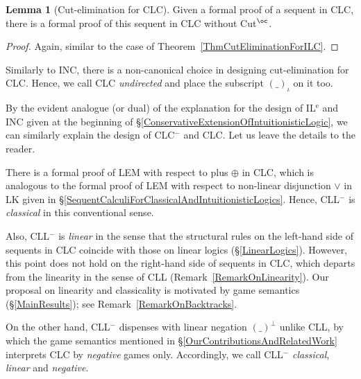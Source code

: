 \documentclass[a4paper]{article}
\theoremstyle{definition}
\theoremstyle{theorem}
\newtheorem{lemma}[definition]{Lemma}
\theoremstyle{remark}
\begin{document}
\begin{lemma}[Cut-elimination for \textsf{CLC}]
\label{PropCutEliminationForCLC}
Given a formal proof of a sequent in \textsf{CLC}, there is a formal proof of this sequent in \textsf{CLC} without Cut$^\oc$.
\end{lemma}
\begin{proof}
Again, similar to the case of Theorem~\ref{ThmCutEliminationForILC}.
\end{proof}

Similarly to \textsf{INC}, there is a non-canonical choice in designing cut-elimination for \textsf{CLC}.
Hence, we call \textsf{CLC} \emph{undirected} and place the subscript $(\_)_\iota$ on it too.
\fi

By the evident analogue (or dual) of the explanation for the design of IL$^{\text{e}}$ and \textsf{INC} given at the beginning of \S\ref{ConservativeExtensionOfIntuitionisticLogic}, we can similarly explain the design of CLC$^-$ and \textsf{CLC}.
Let us leave the details to the reader.

There is a formal proof of LEM with respect to plus $\oplus$ in \textsf{CLC}, which is analogous to the formal proof of LEM with respect to non-linear disjunction $\vee$ in \textsf{LK} given in \S\ref{SequentCalculiForClassicalAndIntuitionisticLogics}.
Hence, CLL$^-$ is \emph{classical} in this conventional sense.

Also, CLL$^-$ is \emph{linear} in the sense that the structural rules on the left-hand side of sequents in \textsf{CLC} coincide with those on linear logics (\S\ref{LinearLogics}).
However, this point does not hold on the right-hand side of sequents in \textsf{CLC}, which departs from the linearity in the sense of CLL (Remark~\ref{RemarkOnLinearity}).
Our proposal on linearity and classicality is motivated by game semantics (\S\ref{MainResults}); see Remark~\ref{RemarkOnBacktracks}.

On the other hand, CLL$^-$ dispenses with linear negation $(\_)^\bot$ unlike CLL, by which the game semantics mentioned in \S\ref{OurContributionsAndRelatedWork} interprets \textsf{CLC} by \emph{negative} games only.
Accordingly, we call CLL$^-$ \emph{classical}, \emph{linear} and \emph{negative}.
\end{document}
